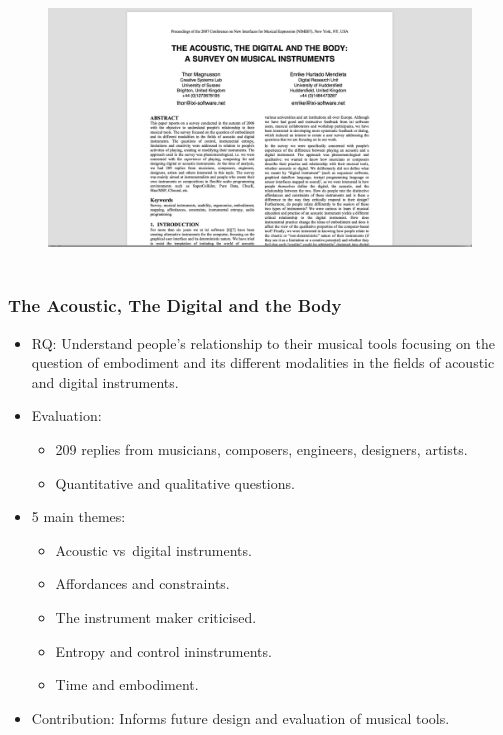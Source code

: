 \documentclass[screen, aspectratio=169]{beamer}
\begin{document}
%
\begin{frame}
\frametitle{}
\begin{figure}
	\includegraphics[scale=0.31]{img/Magnusson-Mendieta-2007.png}\\
	    \cite{Magnusson.Mendieta.2007.NIME}\\
    \end{figure}		
\end{frame}
%
\begin{frame}
\frametitle{The Acoustic, The Digital and the Body}
\begin{itemize}
\item RQ: Understand people's relationship to their musical tools focusing on the question of embodiment and its different modalities in the fields of acoustic and digital instruments.
\item Evaluation:
\begin{itemize}
\item 209 replies from musicians, composers, engineers, designers, artists.
\item Quantitative and qualitative questions.
\end{itemize}
\item 5 main themes:
\begin{itemize}
\item  Acoustic vs\ digital instruments.
\item Affordances and constraints.
\item The instrument maker criticised.
\item Entropy and control ininstruments.
\item Time and embodiment.
\end{itemize}
\item Contribution: Informs future design and evaluation of musical tools.
\end{itemize}
\end{frame}
\end{document}
